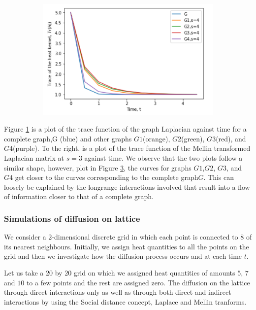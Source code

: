 \documentclass[10pt,a4paper]{article}
\begin{document}
\begin{figure}[H]
\begin{subfigure}[b]{0.45\textwidth}
  	    	\caption{}
  	    	\label{completeL1}
  	    \end{subfigure}~
  	    \begin{subfigure}[b]{0.45\textwidth}
  	    	\includegraphics[width= \textwidth]{images/s4-graphcomp.png}
  	    	\caption{}
  	    	\label{completeMellins3}
  	    \end{subfigure}
  	\end{figure}
      Figure \ref{completeL1} is a plot of the trace function of the graph Laplacian against time for a complete graph,G (blue) and other graphs $G1$(orange), $G2$(green), $G3$(red), and $G4$(purple). To the right, is a plot of the trace function of the Mellin transformed Laplacian matrix at $s=3$ against time. We observe that the two plots follow a similar shape, however, plot in Figure \ref{completeMellins3}, the curves for graphs $G1$,$G2$, $G3$, and $G4$ get closer to the curves corresponding to the complete graph$G$. This can loosely be explained by the longrange interactions involved that result into a flow of information closer to that of a complete graph.
  
	  
        \subsubsection{Simulations of diffusion on lattice}
         We consider a 2-dimensional discrete grid in which each point is connected to 8 of its nearest neighbours. Initially, we assign heat quantities to all the points on the grid and then we investigate how the diffusion process occurs and at each time $t$. 
   
         Let us take a $20$ by $20$ grid on which we assigned heat quantities of amounts $5$, $7$ and $10$ to a few points and the rest are assigned zero. The diffusion on the lattice through direct interactions only as well as through both direct and indirect interactions by using the Social distance concept, Laplace and Mellin tranforms.
         
\end{document}
